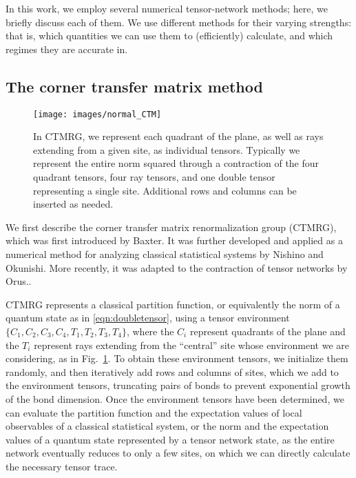 \documentclass[aps,prb,letterpaper,superscriptaddress,twocolumn,showpacs,floatfix,10pt]{revtex4-1}
\begin{document}
In this work, we employ several numerical tensor-network methods; here,
we briefly discuss each of them. We use different methods for their varying
strengths: that is, which quantities we can use them to (efficiently)
calculate, and which regimes they are accurate in.

\subsection{The corner transfer matrix method}
\label{app:CTMRG}

\begin{figure}
\texttt{[image: images/normal\_CTM]}
\caption{In CTMRG, we represent each quadrant of the plane, as well as
rays extending from a given site, as individual tensors.
Typically we represent the
entire norm squared through a contraction of the four quadrant tensors,
four ray tensors, and one double tensor representing a single site. Additional
rows and columns can be inserted as needed.}
\label{fig:normal_CTM}
\end{figure}
We first describe the corner transfer matrix renormalization group (CTMRG),
which was first introduced by Baxter.\cite{Baxter}
It was further developed
and applied as a numerical method for analyzing classical statistical systems
by Nishino and Okunishi.\cite{Nishino_CTMRG_1997} More recently, it was
adapted to the contraction of tensor networks by Orus.\cite{OrusCTM}.

CTMRG represents a classical partition function, or equivalently the norm of
a quantum state as in \eqref{eqn:doubletensor}, using a tensor environment
$\{ C_1,C_2,C_3,C_4,T_1,T_2,T_3,T_4 \}$, where the $C_i$ represent quadrants
of the plane and the $T_i$ represent rays extending from the ``central'' site
whose environment we are considering, as in Fig.~\ref{fig:normal_CTM}.
To obtain these environment tensors, we initialize them randomly, and then
iteratively add rows and columns of sites, which we add to the environment
tensors, truncating pairs of bonds to prevent exponential growth of the bond
dimension.
Once the environment tensors have been determined, we can evaluate the partition
function and the
expectation values of local observables of a classical statistical system,
or the norm and the expectation values of a
quantum state represented by a tensor network state, as the entire network
eventually reduces to only a few sites, on which we can directly calculate
the necessary tensor trace.
\end{document}
